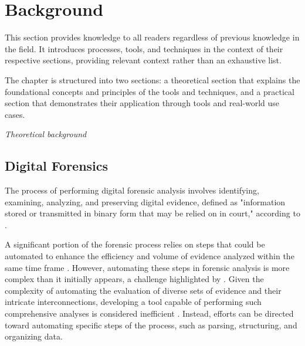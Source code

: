 
\chapter{Background}
\label{cha:background}

This section provides knowledge to all readers regardless of previous knowledge 
in the field. It introduces processes, tools, and techniques in the context of 
their respective sections, providing relevant context rather than 
an exhaustive list.

The chapter is structured into two sections: a theoretical section that explains the foundational concepts and principles of the tools and techniques, and a practical section that demonstrates their application through tools and real-world use cases.

\begin{center}
    \Large\textit{Theoretical background}
\end{center}


\section{Digital Forensics}
\label{sec:background:digital_forensic_methods}

The process of performing digital forensic analysis involves identifying, examining,
analyzing, and preserving digital evidence, defined as "information stored or 
transmitted in binary form that may be relied on in court," according to 
\textcite{nij_digital_multimedia_evidence}.

A significant portion of the forensic process relies on steps that could be automated 
to enhance the efficiency and volume of evidence analyzed within the same time frame 
\cite{automatingForensicMethods}. However, automating these steps in forensic analysis 
is more complex than it initially appears, a challenge highlighted by 
\textcite{automatingForensicMethods}. Given the complexity of automating the evaluation 
of diverse sets of evidence and their intricate interconnections, developing 
a tool capable of performing such comprehensive analyses is considered inefficient 
\cite{automatingForensicMethods}. Instead, efforts can be directed toward automating 
specific steps of the process, such as parsing, structuring, and organizing data.

